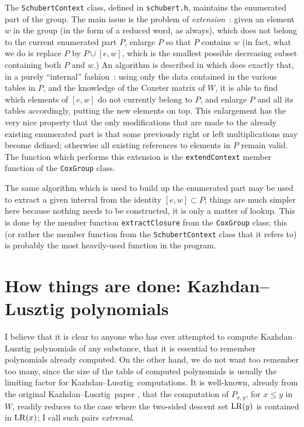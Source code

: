 \documentclass[11pt]{article}
\newcommand{\kl}{Kazh\-dan--Lusz\-tig}
\newcommand{\klpol}{Kazh\-dan--Lusz\-tig po\-ly\-no\-mial}
\newcommand{\LR}{{\rm LR}}
\begin{document}
The {\tt SchubertContext} class, defined in {\tt schubert.h}, maintains the
enumerated part of the group. The main issue is the problem of {\em 
extension}~: given an element $w$ in the group (in the form of a reduced
word, as always), which does not belong to the current enumerated part $P$,
enlarge $P$ so that $P$ contains $w$ (in fact, what we do is replace $P$ by
$P\cup[e,w]$, which is the smallest possible decreasing subset containing both
$P$ and $w$.) An algorithm is described in \cite{du_cloux:2002} which does
exactly that, in a purely ``internal'' fashion~: using only the data contained
in the various tables in $P$, and the knowledge of the Coxeter matrix of $W$,
it is able to find which elements of $[e,w]$ do not currently belong to $P$,
and enlarge $P$ and all its tables accordingly, putting the new elements
on top. This enlargement has the very nice property that the only modifications
that are made to the already existing enumerated part is that some previously
right or left multiplications may become defined; otherwise all existing
references to elements in $P$ remain valid. The function which performs this
extension is the {\tt extendContext} member function of the {\tt CoxGroup}
class.

The same algorithm which is used to build up the enumerated part may be
used to extract a given interval from the identity $[e,w]\subset P$; things
are much simpler here because nothing needs to be constructed, it is only
a matter of lookup. This is done by the member function {\tt extractClosure}
from the {\tt CoxGroup} class; this (or rather the member function from the
{\tt SchubertContext} class that it refers to) is probably the most 
heavily-used function in the program.

\section{How things are done: \klpol s}\label{section:klpols}

I believe that it is clear to anyone who has ever attempted to compute
\klpol s of any substance, that it is essential to remember polynomials
already computed. On the other hand, we do not want too remember too many,
since the size of the table of computed polynomials is usually the
limiting factor for \kl\ computations. It is well-known, already from
the original \kl\ paper \cite{kl:1979}, that the computation of $P_{x,y}$,
for $x\leq y$ in $W$, readily reduces to the case where the two-sided descent 
set $\LR(y)$ is contained in $\LR(x)$; I call such pairs {\em extremal}.
\end{document}
